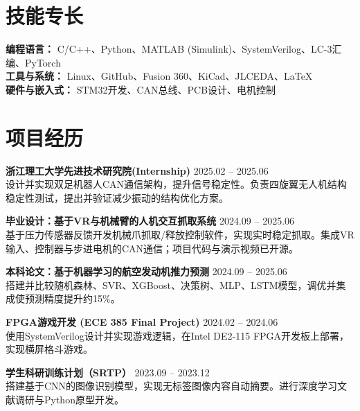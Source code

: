 \documentclass[a4paper,10pt]{article}
\begin{document}
\section*{技能专长}
\noindent
\textbf{编程语言：} C/C++、Python、MATLAB (Simulink)、SystemVerilog、LC-3汇编、PyTorch \\
\textbf{工具与系统：} Linux、GitHub、Fusion 360、KiCad、JLCEDA、LaTeX \\
\textbf{硬件与嵌入式：} STM32开发、CAN总线、PCB设计、电机控制

\section*{项目经历}
\noindent
\textbf{浙江理工大学先进技术研究院(Internship)} \hfill 2025.02 -- 2025.06 \\
设计并实现双足机器人CAN通信架构，提升信号稳定性。负责四旋翼无人机结构稳定性测试，提出并验证减少振动的结构优化方案。

\noindent
\textbf{毕业设计：基于VR与机械臂的人机交互抓取系统} \hfill 2024.09 -- 2025.06 \\
基于压力传感器反馈开发机械爪抓取/释放控制软件，实现实时稳定抓取。集成VR输入、控制器与步进电机的CAN通信；项目代码与演示视频已开源。

\noindent
\textbf{本科论文：基于机器学习的航空发动机推力预测} \hfill 2024.09 -- 2025.06 \\
搭建并比较随机森林、SVR、XGBoost、决策树、MLP、LSTM模型，调优并集成使预测精度提升约15\%。

\noindent
\textbf{FPGA游戏开发 (ECE 385 Final Project)} \hfill 2024.02 -- 2024.06 \\
使用SystemVerilog设计并实现游戏逻辑，在Intel DE2-115 FPGA开发板上部署，实现横屏格斗游戏。

\noindent
\textbf{学生科研训练计划（SRTP）} \hfill 2023.09 -- 2023.12 \\
搭建基于CNN的图像识别模型，实现无标签图像内容自动摘要。进行深度学习文献调研与Python原型开发。
\end{document}
